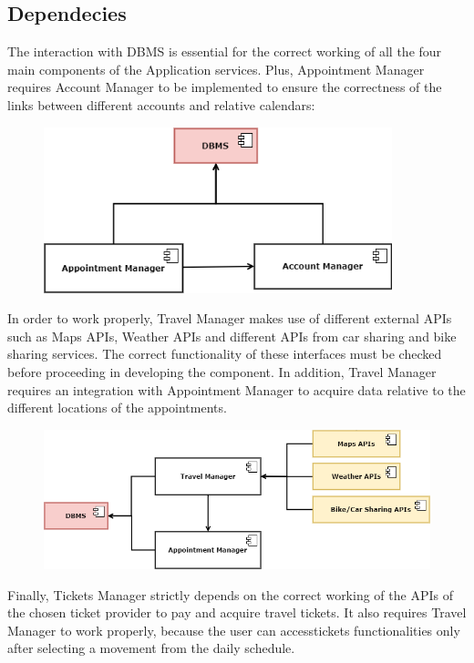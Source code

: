 \subsection{Dependecies}
The interaction with DBMS is essential for the correct working of all the four main components of the Application services. Plus, Appointment Manager requires Account Manager to be implemented to ensure the correctness of the links between different accounts and relative calendars:

\begin{figure}[H]
	\centering
	\includegraphics[width=0.9\textwidth]{Images/Test/1.png}%
\end{figure}

In order to work properly, Travel Manager makes use of different external APIs such as Maps APIs, Weather APIs and different APIs from car sharing and bike sharing services. The correct functionality of these interfaces must be checked before proceeding in developing the component. In addition, Travel Manager requires an integration with Appointment Manager to acquire data relative to the different locations of the appointments.

\begin{figure}[H]
	\centering
	\includegraphics[width=1\textwidth]{Images/Test/2.png}%
\end{figure}

Finally, Tickets Manager strictly depends on the correct working of the APIs of the chosen ticket provider to pay and acquire travel tickets. It also requires Travel Manager to work properly, because the user can accesstickets functionalities only after selecting a movement from the daily schedule. 

